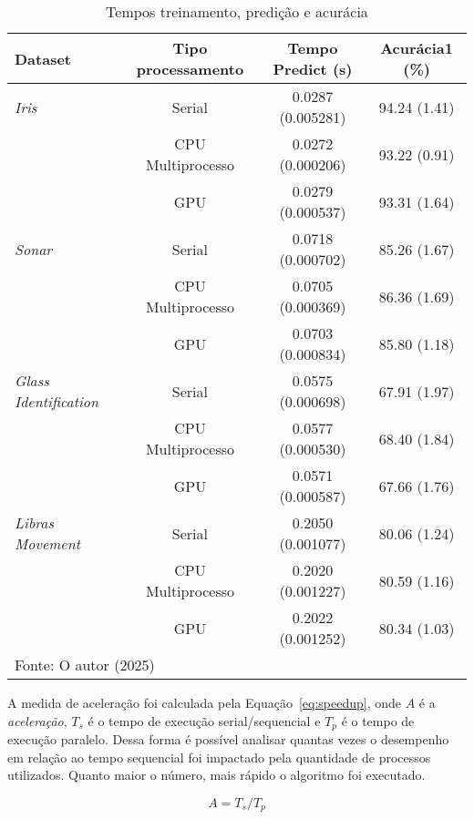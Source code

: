 \begin{table}[H]
\caption{Tempos treinamento, predição e acurácia}
\begin{center}
\fontsize{10pt}{13pt}\selectfont
\begin{tabular}{lccc}
\hline
Dataset                       & Tipo processamento  &   Tempo Predict (s)    &Acurácia1 (\%) \\
\hline
\textit{Iris}                 & Serial              &  0.0287 (0.005281)     & 94.24 (1.41)  \\
                              & CPU Multiprocesso   &  0.0272 (0.000206)     & 93.22 (0.91)  \\
                              & GPU                 &  0.0279 (0.000537)     & 93.31 (1.64)  \\
\hline
\textit{Sonar}                & Serial              &  0.0718 (0.000702)     & 85.26 (1.67)  \\
                              & CPU Multiprocesso   &  0.0705 (0.000369)     & 86.36 (1.69)  \\
                              & GPU                 &  0.0703 (0.000834)     & 85.80 (1.18)  \\
\hline
\textit{Glass Identification} & Serial              &  0.0575 (0.000698)     & 67.91 (1.97)  \\
                              & CPU Multiprocesso   &  0.0577 (0.000530)     & 68.40 (1.84)  \\
                              & GPU                 &  0.0571 (0.000587)     & 67.66 (1.76)  \\
\hline
\textit{Libras Movement}      & Serial              &  0.2050 (0.001077)     & 80.06 (1.24)  \\
                              & CPU Multiprocesso   &  0.2020 (0.001227)     & 80.59 (1.16)  \\
                              & GPU                 &  0.2022 (0.001252)     & 80.34 (1.03)  \\
\hline
\multicolumn{4}{l}{Fonte: O autor (2025)}
\end{tabular}
\label{tab:resultados}
\end{center}
\end{table}


A medida de aceleração %
foi calculada pela Equação~\eqref{eq:speedup}, onde \(A\) é a \textit{aceleração}, \(T_s\) é o tempo de execução serial/sequencial e \(T_p\) é o tempo de execução paralelo. Dessa forma é possível analisar quantas vezes o desempenho em relação ao tempo sequencial foi impactado pela quantidade de processos utilizados. Quanto maior o número, mais rápido o algoritmo foi executado. 

\begin{equation} 
A = T_s / T_p
\label{eq:speedup}
\end{equation}